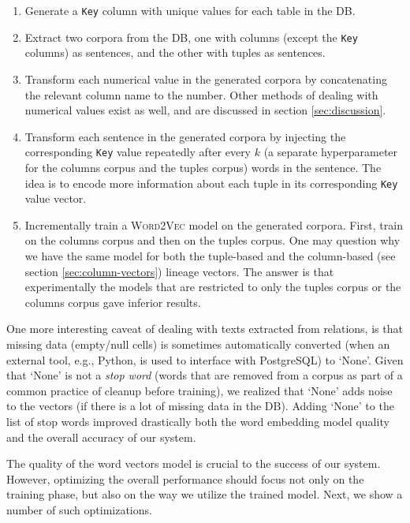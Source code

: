 \begin{enumerate}
    \item Generate a \texttt{Key} column with unique values for each table in the DB.
    \item Extract two corpora from the DB, one with columns (except the \texttt{Key} columns) as sentences, and the other with tuples as sentences.
    \item Transform each numerical value in the generated corpora by concatenating the relevant column name to the number. Other methods of dealing with numerical values exist as well, and are discussed in section \ref{sec:discussion}.
    \item Transform each sentence in the generated corpora by injecting the corresponding \texttt{Key} value repeatedly after every $k$ (a separate hyperparameter for the columns corpus and the tuples corpus) words in the sentence. The idea is to encode more information about each tuple in its corresponding \texttt{Key} value vector.
    \item Incrementally train a \textsc{Word2Vec} model on the generated corpora. First, train on the columns corpus and then on the tuples corpus. One may question why we have the same model for both the tuple-based and the column-based (see section \ref{sec:column-vectors}) lineage vectors. The answer is that experimentally the models that are restricted to only the tuples corpus or the columns corpus gave inferior results.
\end{enumerate}
One more interesting caveat of dealing with texts extracted from relations, is that missing data (empty/null cells) is sometimes automatically converted (when an external tool, e.g., Python, is used to interface with PostgreSQL) to `None'. Given that `None' is not a \textit{stop word} (words that are removed from a corpus as part of a common practice of cleanup before training), we realized that `None' adds noise to the vectors (if there is a lot of missing data in the DB). Adding `None' to the list of stop words improved drastically both the word embedding model quality and the overall accuracy of our system. \\

\par The quality of the word vectors model is crucial to the success of our system. However, optimizing the overall performance should focus not only on the training phase, but also on the way we utilize the trained model. Next, we show a number of such optimizations.\\
